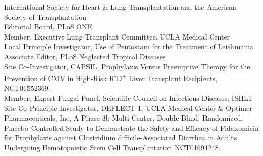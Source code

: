 \documentclass[11pt]{nih-blank}%
\newcommand{\txsp}[1]{\textsuperscript{#1}}
\numberwithin{equation}{subsection}
\numberwithin{figure}{subsection}
\numberwithin{table}{subsection}
\begin{document}
\begin{parcolumns}[colwidths={1=.86in,2=6.6in}]{2}
{      %
      International Society for Heart \& Lung Transplantation and the American Society of Transplantation\\
      Editorial Board, {\smaller PL}o{\smaller S} {\smaller ONE}\\
      Member, Executive Lung Transplant Committee, {\smaller UCLA} Medical Center\\
      Local Principle Investigator, Use of Pentostam for the Treatment of Leishmania\\
      Associate Editor, {\smaller PL}o{\smaller S} Neglected Tropical Diseases\\
      Site Co-Investigator, {\smaller CAPSIL}, Prophylaxis Versus Preemptive Therapy for the Prevention of {\smaller CMV} in High-Risk R\txsp{-}D\txsp{+} Liver Transplant Recipients, {\smaller NCT}01552369.\\
      Member, Expert Fungal Panel, Scientific Council on Infectious Diseases, {\smaller ISHLT}\\
      Site Co-Principle Investigator, {\smaller DEFLECT-1}, {\smaller UCLA} Medical Center \& Optimer Pharmaceuticals, Inc, A Phase 3b Multi-Center, Double-Blind, Randomized, Placebo Controlled Study to Demonstrate the Safety and Efficacy of Fidaxomicin for Prophylaxis against Clostridium difficile-Associated Diarrhea in Adults Undergoing Hematopoietic Stem Cell Transplantation {\smaller NCT}01691248.\\
}
\end{parcolumns}
\end{document}
